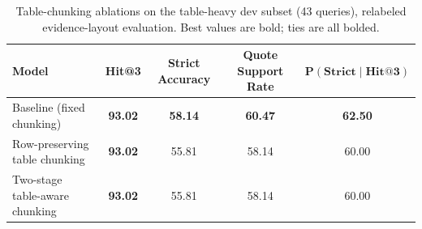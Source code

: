 \begin{table}[t]
\centering
\small
\setlength{\tabcolsep}{6pt}
\caption{Table-chunking ablations on the table-heavy dev subset (43 queries), relabeled evidence-layout evaluation. Best values are bold; ties are all bolded.}
\label{tab:table_chunking_ablation_tableheavy_relabel_rag_style}
\begin{tabular}{lcccc}
\toprule
\textbf{Model} &
\textbf{Hit@3} &
\textbf{Strict Accuracy} &
\textbf{Quote Support Rate} &
$\mathbf{P(\text{Strict} \mid \text{Hit@3})}$ \\
\midrule
Baseline (fixed chunking)                & \textbf{93.02} & \textbf{58.14} & \textbf{60.47} & \textbf{62.50} \\
Row-preserving table chunking            & \textbf{93.02} & 55.81          & 58.14          & 60.00          \\
Two-stage table-aware chunking           & \textbf{93.02} & 55.81          & 58.14          & 60.00          \\
\bottomrule
\end{tabular}
\end{table}

